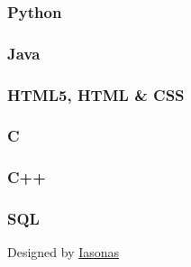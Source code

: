 \documentclass[english,]{article}
\begin{document}
\hypertarget{python}{%
\subsubsection{Python}\label{python}}

\hypertarget{java}{%
\subsubsection{Java}\label{java}}

\hypertarget{html5-html-css}{%
\subsubsection{HTML5, HTML \& CSS}\label{html5-html-css}}

\hypertarget{c}{%
\subsubsection{C}\label{c}}

\hypertarget{c-1}{%
\subsubsection{C++}\label{c-1}}

\hypertarget{sql}{%
\subsubsection{SQL}\label{sql}}

{Designed by \href{https://github.com/u2nmd}{Iasonas}}
\end{document}
